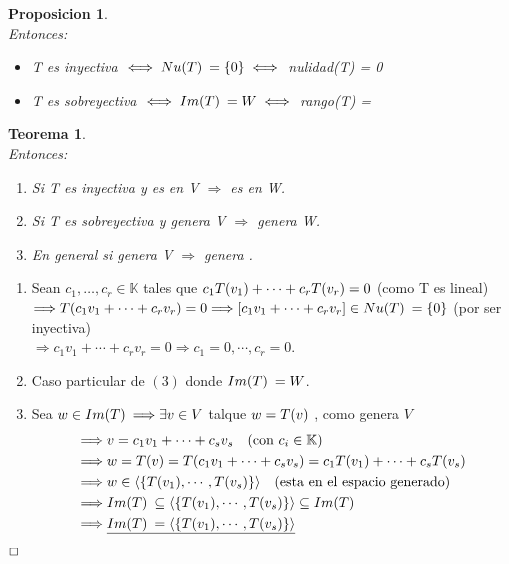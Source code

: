 \documentclass[]{article}
\newtheorem{theorem}{Teorema}
\newtheorem{proposition}{Proposicion}[theorem]
\newenvironment{proof}{\noindent{\bf Prueba:}}{$\hfill \Box$ \vspace{10pt}}
\newcommand{\K}{
    \mathbb{K}
}
\newcommand{\ida}{\Longrightarrow}
\begin{document}
\begin{proposition}
    \\
    Entonces:
    \begin{itemize}
        \item T es inyectiva $\iff \text{$Nu(T)$}\: = \text{$\{ {0} \}$} \iff$ nulidad(T) = 0
        \item T es sobreyectiva $\iff \text{$Im(T)$}\: = W \iff$ rango(T) = 
    \end{itemize}
\end{proposition}

\begin{theorem}
    \\
    Entonces:
    \begin{enumerate}
        \item Si T es inyectiva y  es \li en V
        $\ida$  es \li en W.
        \item Si T es sobreyectiva y  genera V $\ida$
         genera W.
        \item En general si  genera V $\ida$
         genera \I.
    \end{enumerate}
\end{theorem}
\begin{proof}
    \begin{enumerate}
        \item Sean $c_1,\dots,c_r \in \K$ tales que $c_1\text{$T({v_1})$}+\cdots+c_r\text{$T({v_r})$}=0$ (como T es lineal)\\
        $\ida \T{c_1v_1+\cdots+c_rv_r}=0 \ida [c_1v_1+\cdots+c_rv_r] \in \N=\conjunto{0}$ (por ser inyectiva)\\
        $\ida c_1v_1+\cdots+c_rv_r=0 \ida c_1=0,\cdots,c_r=0$.
        \item Caso particular de $(3)$ donde $\text{$Im(T)$}\:=W$.
        \item Sea $w \in \I \ida \exists v \in V$ talque $w=\text{$T({v})$}$ , como  genera $V$
        \begin{align*}
            &\ida v= c_1v_1+\cdots+c_sv_s \quad \text{(con $c_i \in \K$)}\\
            &\ida w=\T{v}=\T{c_1v_1+\cdots+c_sv_s}=c_1\T{v_1}+\cdots+c_s\T{v_s}\\
            &\ida w \in \espgen{\conjunto{\T{v_1},\cdots,\T{v_s}}} \quad \text{(esta en el espacio generado)}\\
            &\ida \I \subseteq \espgen{\conjunto{\T{v_1},\cdots,\T{v_s}}} \subseteq \I\\
            &\ida \underline{\I=\espgen{\conjunto{\T{v_1},\cdots,\T{v_s}}}}  
        \end{align*}
    \end{enumerate}
\end{proof}
\end{document}
